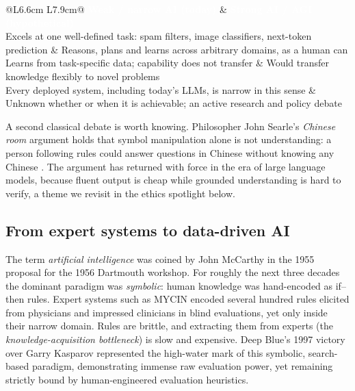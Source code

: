 \documentclass[11pt,a4paper]{article}
\begin{document}
	\begin{keyconcept}
		\begin{center}
			\small\sffamily
			\renewcommand{\arraystretch}{1.25}
			\begin{tabular}{@{}L{6.6cm} L{7.9cm}@{}}
				\toprule
				\textcolor{white}{\textbf{Weak / narrow AI (today)}} &
				\textcolor{white}{\textbf{Strong AI / AGI (hypothetical)}} \\
				\midrule
				Excels at one well-defined task: spam filters, image classifiers, next-token prediction &
				Reasons, plans and learns across arbitrary domains, as a human can \\
				Learns from task-specific data; capability does not transfer &
				Would transfer knowledge flexibly to novel problems \\
				Every deployed system, including today's LLMs, is narrow in this sense &
				Unknown whether or when it is achievable; an active research and policy debate \\
				\bottomrule
			\end{tabular}
		\end{center}
	\end{keyconcept}
	
	A second classical debate is worth knowing. Philosopher John Searle's
	\emph{Chinese room} argument holds that symbol manipulation alone is
	not understanding: a person following rules could answer questions in
	Chinese without knowing any Chinese \parencite{searle1980}. The argument
	has returned with force in the era of large language models, because
	fluent output is cheap while grounded understanding is hard to verify, a theme we revisit in the ethics spotlight below.
	
	\subsection{From expert systems to data-driven AI}
	
	The term \emph{artificial intelligence} was coined by John McCarthy in the 1955 proposal for the 1956 Dartmouth workshop. For roughly the next three decades the dominant paradigm was
	\emph{symbolic}: human knowledge was hand-encoded as if--then rules.
	Expert systems such as MYCIN encoded several hundred rules elicited
	from physicians and impressed clinicians in blind evaluations, yet
	only inside their narrow domain. Rules are brittle, and extracting them
	from experts (the \emph{knowledge-acquisition bottleneck}) is slow and
	expensive. Deep Blue's 1997 victory over Garry Kasparov represented the high-water mark of this symbolic, search-based paradigm, demonstrating immense raw evaluation power, yet remaining strictly bound by human-engineered evaluation heuristics.
	
\end{document}
